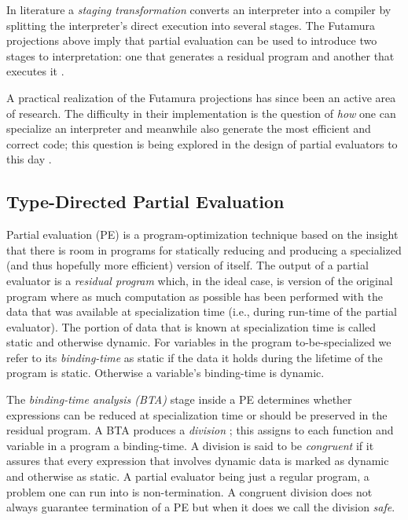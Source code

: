 \documentclass[a4paper,12pt,twoside,openright]{report}
\theoremstyle{definition}
\begin{document}
In literature a \textit{staging transformation} \cite{jorring1986compilers,brady2006verified}  converts an interpreter into a compiler by splitting the interpreter's direct execution into several stages. The Futamura projections above imply that partial evaluation can be used to introduce two stages to interpretation: one that generates a residual program and another that executes it \cite{jones1993partial}.

A practical realization of the Futamura projections has since been an active area of research. The difficulty in their implementation is the question of \textit{how} one can specialize an interpreter and meanwhile also generate the most efficient and correct code; this question is being explored in the design of partial evaluators to this day \cite{jones1988challenging,jones1993partial}.

\subsection{Type-Directed Partial Evaluation}\label{subsec:tdpe}
Partial evaluation (PE) is a program-optimization technique based on the insight that there is room in programs for statically reducing and producing a specialized (and thus hopefully more efficient) version of itself. The output of a partial evaluator is a \textit{residual program} which, in the ideal case, is version of the original program where as much computation as possible has been performed with the data that was available at specialization time (i.e., during run-time of the partial evaluator). The portion of data that is known at specialization time is called static and otherwise dynamic. For variables in the program to-be-specialized we refer to its \textit{binding-time} as static if the data it holds during the lifetime of the program is static. Otherwise a variable's binding-time is dynamic.

The \textit{binding-time analysis (BTA)} stage inside a PE determines whether expressions can be reduced at specialization time or should be preserved in the residual program. A BTA produces a \textit{division} \cite{jones1993partial}; this assigns to each function and variable in a program a binding-time. A division is said to be \textit{congruent} if it assures that every expression that involves dynamic data is marked as dynamic and otherwise as static. A partial evaluator being just a regular program, a problem one can run into is non-termination. A congruent division does not always guarantee termination of a PE but when it does we call the division \textit{safe}.
\end{document}
